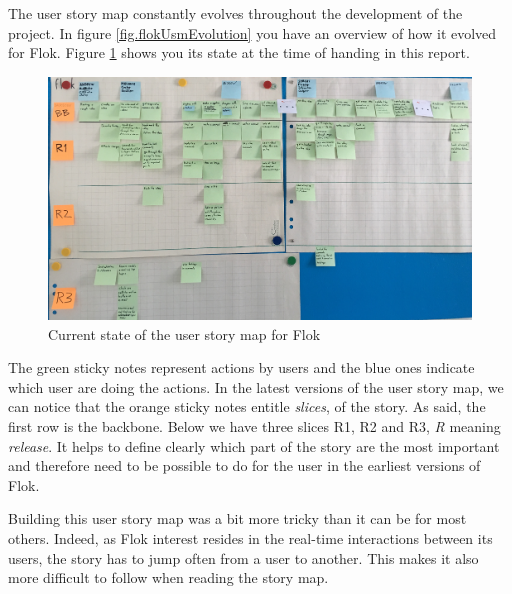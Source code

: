 \documentclass[a4paper,12pt, oneside]{article}
\begin{document}
The user story map constantly evolves throughout the development of the project.
In figure \ref{fig.flokUsmEvolution} you have an overview of how it evolved for Flok.
Figure \ref{fig.flokUsmCurrent} shows you its state at the time of handing in this report.

\begin{figure}[!htb]
    \centering
    \includegraphics[width=\textwidth]{images/flokUsmCurrent.jpg}
    \caption{Current state of the user story map for Flok}
    \label{fig.flokUsmCurrent}
\end{figure}

The green sticky notes represent actions by users and the blue ones indicate which user are doing the actions.
In the latest versions of the user story map, we can notice that the orange sticky notes entitle \emph{slices}, of the story.
As said, the first row is the backbone.
Below we have three slices R1, R2 and R3, \emph{R} meaning \emph{release}.
It helps to define clearly which part of the story are the most important and therefore need to be possible to do for the user in the earliest versions of Flok.

Building this user story map was a bit more tricky than it can be for most others.
Indeed, as Flok interest resides in the real-time interactions between its users, the story has to jump often from a user to another.
This makes it also more difficult to follow when reading the story map.

\FloatBarrier
\end{document}

